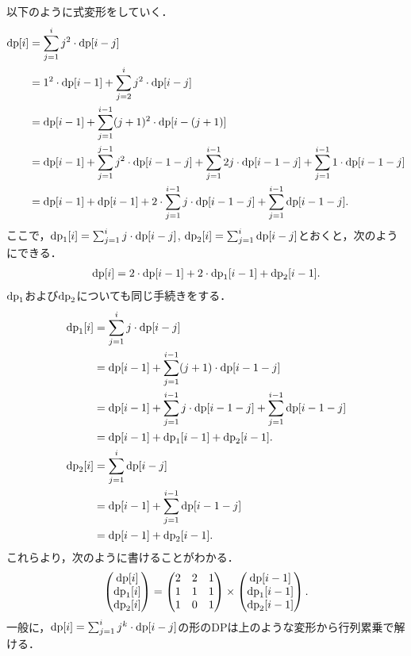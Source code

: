 \documentclass{jsarticle}
\newcommand{\DP}{\ensuremath\mathrm{dp}}
\begin{document}
\noindent
以下のように式変形をしていく．
\begin{align*}
  \DP[i]
  &= \sum_{j=1}^i j^2\cdot\DP[i-j]\\
  &= 1^2\cdot\DP[i-1] + \sum_{j=2}^i j^2\cdot\DP[i-j]\\
  &= \DP[i-1] + \sum_{j=1}^{i-1} (j+1)^2\cdot\DP[i-(j+1)]\\
  &= \DP[i-1] + \sum_{j=1}^{j-1} j^2\cdot\DP[i-1-j] + \sum_{j=1}^{i-1} 2j\cdot\DP[i-1-j] + \sum_{j=1}^{i-1} 1\cdot\DP[i-1-j]\\
  &= \DP[i-1] + \DP[i-1] + 2\cdot\sum_{j=1}^{i-1} j\cdot\DP[i-1-j] + \sum_{j=1}^{i-1} \DP[i-1-j].
\end{align*}
ここで，$\DP_1[i] = \sum_{j=1}^i j\cdot\DP[i-j]$, $\DP_2[i] = \sum_{j=1}^i \DP[i-j]$とおくと，次のようにできる．
\begin{align*}
  \DP[i] = 2\cdot\DP[i-1] + 2\cdot\DP_1[i-1] + \DP_2[i-1].
\end{align*}
$\DP_1$および$\DP_2$についても同じ手続きをする．
\begin{align*}
  \DP_1[i]
  &= \sum_{j=1}^i j\cdot\DP[i-j]\\
  &= \DP[i-1] + \sum_{j=1}^{i-1} (j+1)\cdot\DP[i-1-j]\\
  &= \DP[i-1] + \sum_{j=1}^{i-1} j\cdot\DP[i-1-j] + \sum_{j=1}^{i-1} \DP[i-1-j]\\
  &= \DP[i-1] + \DP_1[i-1] + \DP_2[i-1].\\
  \DP_2[i]
  &= \sum_{j=1}^i \DP[i-j]\\
  &= \DP[i-1] + \sum_{j=1}^{i-1} \DP[i-1-j]\\
  &= \DP[i-1] + \DP_2[i-1].
\end{align*}
これらより，次のように書けることがわかる．
\[
\left(\begin{matrix}
  \DP[i]\\
  \DP_1[i]\\
  \DP_2[i]
\end{matrix}\right) = \left(\begin{matrix}
  2 & 2 & 1\\
  1 & 1 & 1\\
  1 & 0 & 1
\end{matrix}\right) \times \left(\begin{matrix}
  \DP[i-1]\\
  \DP_1[i-1]\\
  \DP_2[i-1]
\end{matrix}\right).
\]
一般に，$\DP[i] = \sum_{j=1}^i j^k\cdot\DP[i-j]$の形のDPは上のような変形から行列累乗で解ける．
\end{document}
